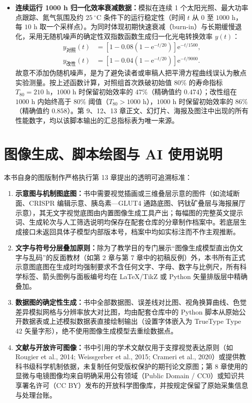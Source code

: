 \begin{itemize}
  \item \textbf{连续运行 1000 h 归一化效率衰减数据：}模拟在连续 1 个太阳光照、最大功率点跟踪、氮气氛围及约 $25\ ^\circ\text{C}$ 条件下的运行稳定性（时间 $t$ 从 $0$ 至 $1000\text{ h}$，每 $10\text{ h}$ 取一个采样点）。为同时体现初期快速衰减（burn-in）与长期缓慢退化，采用无随机噪声的确定性双指数函数生成归一化光电转换效率 $y(t)$：
  \begin{align*}
    y_{\text{对照}}(t) &= \left[1 - 0.08\left(1 - \mathrm{e}^{-t/20}\right)\right]\mathrm{e}^{-t/1500}, \\
    y_{\text{改性}}(t) &= \left[1 - 0.04\left(1 - \mathrm{e}^{-t/20}\right)\right]\mathrm{e}^{-t/9000}.
  \end{align*}
  故意不添加伪随机噪声，是为了避免读者或审稿人把平滑方程曲线误认为散点实验测量。按上述函数计算，对照组首次跌破初始值 80\% 的寿命指标 $T_{80} = 210\text{ h}$，$1000\text{ h}$ 时保留初始效率的 $47\%$（精确值约 $0.474$）；改性组在 $1000\text{ h}$ 内始终高于 $80\%$ 阈值（$T_{80} > 1000\text{ h}$），$1000\text{ h}$ 时保留初始效率的 $86\%$（精确值约 $0.858$）。第 9、12、13 章正文、幻灯片、海报及图注中出现的所有性能数字，均以该脚本输出的汇总指标表为唯一来源。
\end{itemize}

\section{图像生成、脚本绘图与 AI 使用说明}

本书自身的图版制作严格执行第 13 章提出的透明可追溯标准：

\begin{enumerate}
  \item \textbf{示意图与机制图底图：}书中需要视觉插画或三维叠层示意的图件（如流域断面、CRISPR 编辑示意、胰岛素—GLUT4 通路底图、钙钛矿叠层与海报展厅示意），其无文字视觉底图由内置图像生成工具产出；每幅图的完整英文提示词、生成轮次与人工筛选说明均保存在配套仓库的分章制作档案中。若底层生成接口未返回具体子模型内部版本号，档案中均如实标注而不作主观推断。
  \item \textbf{文字与符号分层叠加原则：}除为了教学目的专门展示“图像生成模型直出伪文字与乱码”的反面教材（如第 2 章与第 7 章中的初稿反例）外，本书所有正式示意图底图在生成时均强制要求不含任何文字、字母、数字与比例尺，所有科学标签、箭头图例与面板编号均在 LaTeX/TikZ 或 Python 矢量排版层中精确叠加。
  \item \textbf{数据图的确定性生成：}书中全部数据图、误差线对比图、视角换算曲线、色觉差异模拟网格与分辨率放大对比图，均由配套仓库中的 Python 脚本从原始公开数据表或上述模拟数据表直接绘制输出（设置字体嵌入为 TrueType Type 42 矢量字形），绝不使用图像生成模型去重绘数据点。
  \item \textbf{文献与开放许可图像：}书中引用的学术文献仅用于支撑视觉表达原则（如 Rougier et al., 2014; Weissgerber et al., 2015; Crameri et al., 2020）或提供教科书级科学机制依据，未复制任何受版权保护的期刊论文原图；第 8 章使用的显微与电镜图像均来自明确采用公有领域（Public Domain / CC0）或知识共享署名许可（CC BY）发布的开放科学图像库，并按规定保留了原始采集信息与处理台账。
\end{enumerate}

